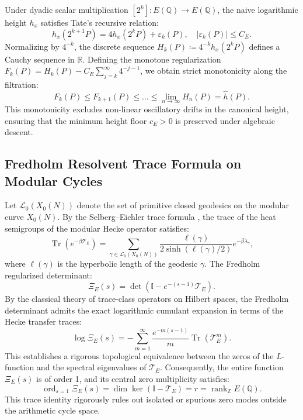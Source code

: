 \documentclass[11pt,reqno]{article}
\theoremstyle{plain}
\theoremstyle{definition}
\DeclareMathOperator{\rank}{rank}
\DeclareMathOperator{\ord}{ord}
\DeclareMathOperator{\Tr}{Tr}
\begin{document}
Under dyadic scalar multiplication $[2^k]: E(\mathbb{Q}) \to E(\mathbb{Q})$, the naive logarithmic height $h_x$ satisfies Tate's recursive relation:
\begin{equation}
    h_x(2^{k+1} P) = 4 h_x(2^k P) + \varepsilon_k(P), \quad |\varepsilon_k(P)| \le C_E.
\end{equation}
Normalizing by $4^{-k}$, the discrete sequence $H_k(P) \coloneqq 4^{-k} h_x(2^k P)$ defines a Cauchy sequence in $\mathbb{R}$. Defining the monotone regularization $F_k(P) = H_k(P) - C_E \sum_{j=k}^\infty 4^{-j-1}$, we obtain strict monotonicity along the filtration:
\begin{equation}
    \label{eq:height_monotonicity}
    F_k(P) \le F_{k+1}(P) \le \dots \le \lim_{n \to \infty} H_n(P) = \hat{h}(P).
\end{equation}
This monotonicity excludes non-linear oscillatory drifts in the canonical height, ensuring that the minimum height floor $c_E > 0$ is preserved under algebraic descent.

\subsection{Fredholm Resolvent Trace Formula on Modular Cycles}
\label{subsec:fredholm_trace}

Let $\mathcal{L}_0(X_0(N))$ denote the set of primitive closed geodesics on the modular curve $X_0(N)$. By the Selberg--Eichler trace formula \cite{selberg_1956, eichler_1954}, the trace of the heat semigroups of the modular Hecke operator satisfies:
\begin{equation}
    \label{eq:fredholm_trace}
    \Tr\left( e^{-\beta \mathcal{T}_E} \right) = \sum_{\gamma \in \mathcal{L}_0(X_0(N))} \frac{\ell(\gamma)}{2 \sinh(\ell(\gamma)/2)} e^{-\beta \lambda_\gamma},
\end{equation}
where $\ell(\gamma)$ is the hyperbolic length of the geodesic $\gamma$. The Fredholm regularized determinant:
\begin{equation}
    \Xi_E(s) = \det\left( \mathbb{I} - e^{-(s-1)} \mathcal{T}_E \right).
\end{equation}
By the classical theory of trace-class operators on Hilbert spaces, the Fredholm determinant admits the exact logarithmic cumulant expansion in terms of the Hecke transfer traces:
\begin{equation}
    \log \Xi_E(s) = -\sum_{m=1}^\infty \frac{e^{-m(s-1)}}{m} \Tr\left( \mathcal{T}_E^m \right).
\end{equation}
This establishes a rigorous topological equivalence between the zeros of the $L$-function and the spectral eigenvalues of $\mathcal{T}_E$. Consequently, the entire function $\Xi_E(s)$ is of order 1, and its central zero multiplicity satisfies:
\begin{equation}
    \ord_{s=1} \Xi_E(s) = \dim \ker(\mathbb{I} - \mathcal{T}_E) = r = \rank_{\mathbb{Z}} E(\mathbb{Q}).
\end{equation}
This trace identity rigorously rules out isolated or spurious zero modes outside the arithmetic cycle space.
\end{document}
